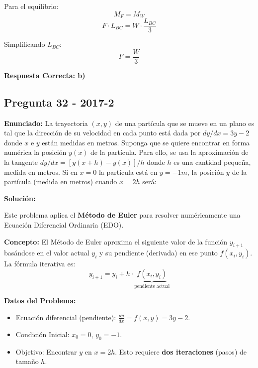 \documentclass{article}
\begin{document}
Para el equilibrio:
$$ M_F = M_W $$
$$ F \cdot L_{BC} = W \cdot \frac{L_{BC}}{3} $$

Simplificando $L_{BC}$:
$$ F = \frac{W}{3} $$

\noindent{}

\textbf{Respuesta Correcta: b)}

\vspace{0.5cm}

\subsection*{Pregunta 32 - 2017-2}
\textbf{Enunciado:}
La trayectoria $(x, y)$ de una partícula que se mueve en un plano es tal que la dirección de su velocidad en cada punto está dada por $dy/dx = 3y - 2$ donde $x$ e $y$ están medidas en metros. Suponga que se quiere encontrar en forma numérica la posición $y(x)$ de la partícula. Para ello, se usa la aproximación de la tangente $dy/dx = [y(x + h) - y(x)]/h$ donde $h$ es una cantidad pequeña, medida en metros. Si en $x = 0$ la partícula está en $y = -1m$, la posición $y$ de la partícula (medida en metros) cuando $x = 2h$ será:

\textbf{Solución:}

Este problema aplica el \textbf{Método de Euler} para resolver numéricamente una Ecuación Diferencial Ordinaria (EDO).

\textbf{Concepto:}
El Método de Euler aproxima el siguiente valor de la función $y_{i+1}$ basándose en el valor actual $y_i$ y su pendiente (derivada) en ese punto $f(x_i, y_i)$.
La fórmula iterativa es:
$$ y_{i+1} = y_i + h \cdot \underbrace{f(x_i, y_i)}_{\text{pendiente actual}} $$

\textbf{Datos del Problema:}
\begin{itemize}
    \item Ecuación diferencial (pendiente): $\frac{dy}{dx} = f(x,y) = 3y - 2$.
    \item Condición Inicial: $x_0 = 0$, $y_0 = -1$.
    \item Objetivo: Encontrar $y$ en $x = 2h$. Esto requiere \textbf{dos iteraciones} (pasos) de tamaño $h$.
\end{itemize}
\end{document}
